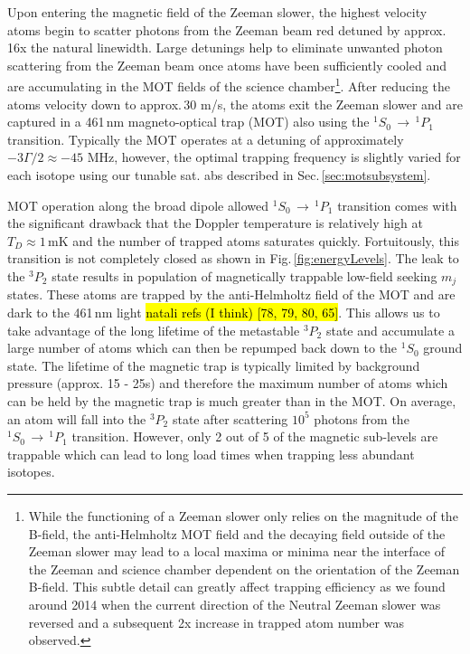 Upon entering the magnetic field of the Zeeman slower, the highest velocity atoms begin to scatter photons from the Zeeman beam red detuned by approx. 16x the natural linewidth.
Large detunings help to eliminate unwanted photon scattering from the Zeeman beam once atoms have been sufficiently cooled and are accumulating in the MOT fields of the science chamber\footnote{
While the functioning of a Zeeman slower only relies on the magnitude of the B-field, the anti-Helmholtz MOT field and the decaying field outside of the Zeeman slower may lead to a local maxima or minima near the interface of the Zeeman and science chamber dependent on the orientation of the Zeeman B-field.
This subtle detail can greatly affect trapping efficiency as we found around 2014 when the current direction of the Neutral Zeeman slower was reversed and a subsequent 2x increase in trapped atom number was observed.}. 
After reducing the atoms velocity down to approx.\,30 m/s, the atoms exit the Zeeman slower and are captured in a 461\,nm magneto-optical trap (MOT) also using the $^1S_0\,\rightarrow\,^1P_1$ transition. 
Typically the MOT operates at a detuning of approximately $-3\Gamma/2 \approx -45$ MHz, however, the optimal trapping frequency is slightly varied for each isotope using our tunable sat. abs described in Sec.\,\ref{sec:motsubsystem}. 

MOT operation along the broad dipole allowed $^1S_0\,\rightarrow\,^1P_1$ transition comes with the significant drawback that the Doppler temperature is relatively high at $T_D\approx1$\,mK and the number of trapped atoms saturates quickly.
Fortuitously, this transition is not completely closed as shown in Fig.\,\ref{fig:energyLevels}.
The leak to the $^3P_2$ state results in population of magnetically trappable low-field seeking $m_j$ states. 
These atoms are trapped by the anti-Helmholtz field of the MOT and are dark to the 461\,nm light \hl{natali refs (I think) [78, 79, 80, 65]}.
This allows us to take advantage of the long lifetime of the metastable $^3P_2$ state and accumulate a large number of atoms which can then be repumped back down to the $^1S_0$ ground state.
The lifetime of the magnetic trap is typically limited by background pressure (approx. 15 - 25s) and therefore the maximum number of atoms which can be held by the magnetic trap is much greater than in the MOT.
On average, an atom will fall into the $^3P_2$ state after scattering $10^5$ photons from the $^1S_0\,\rightarrow\,^1P_1$ transition.
However, only 2 out of 5 of the magnetic sub-levels are trappable which can lead to long load times when trapping less abundant isotopes.


